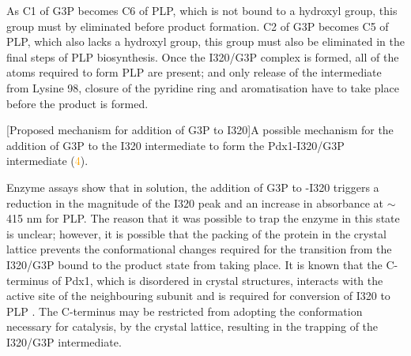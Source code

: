 As C1 of G3P becomes C6 of PLP, which is not bound to a hydroxyl group, this group must by eliminated before product formation. C2 of G3P becomes C5 of PLP, which also lacks a hydroxyl group, this group must also be eliminated in the final steps of PLP biosynthesis. Once the I320/G3P complex is formed, all of the atoms required to form PLP are present; and only release of the intermediate from Lysine 98, closure of the pyridine ring and aromatisation have to take place before the product is formed.    
      


\begin{minipage}{\linewidth}
	[Proposed mechanism for addition of G3P to I320]{A possible mechanism for the addition of G3P to the I320 intermediate to form the Pdx1-I320/G3P intermediate (\textcolor{orange}{4}).\label{fig:I320toG3P}} 		
\end{minipage}      

Enzyme assays show that in solution, the addition of G3P to \atpdx -I320 triggers a reduction in the magnitude of the I320 peak and an increase in absorbance at $\sim$415 nm for PLP. The reason that it was possible to trap the enzyme in this state is unclear; however, it is possible that the packing of the protein in the crystal lattice prevents the conformational changes required  for the transition from the I320/G3P bound to the product state from taking place. It is known that the C-terminus of Pdx1, which is disordered in crystal structures, interacts with the active site of the neighbouring subunit and is required for conversion of I320 to PLP \cite{Raschle2009,Moccand2011}. The C-terminus may be restricted from adopting the conformation necessary for catalysis, by the crystal lattice, resulting in the trapping of the I320/G3P intermediate.    

